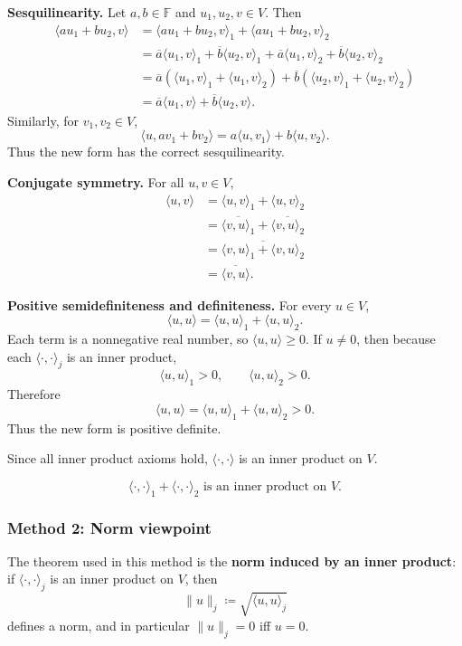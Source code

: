 \documentclass[12pt]{article}
\newcommand{\df}{\coloneqq}
\newcommand{\F}{\mathbb{F}}
\begin{document}
\medskip
\noindent\textbf{Sesquilinearity.}
Let $a,b\in\F$ and $u_1,u_2,v\in V$. Then
\begin{align*}
\langle au_1+bu_2,v\rangle
&=\langle au_1+bu_2,v\rangle_1+\langle au_1+bu_2,v\rangle_2\\
&=\overline{a}\langle u_1,v\rangle_1+
\overline{b}\langle u_2,v\rangle_1+
\overline{a}\langle u_1,v\rangle_2+
\overline{b}\langle u_2,v\rangle_2\\
&=\overline{a}(\langle u_1,v\rangle_1+\langle u_1,v\rangle_2)
+\overline{b}(\langle u_2,v\rangle_1+\langle u_2,v\rangle_2)\\
&=\overline{a}\langle u_1,v\rangle+\overline{b}\langle u_2,v\rangle.
\end{align*}
Similarly, for $v_1,v_2\in V$,
\[
\langle u,av_1+bv_2\rangle=a\langle u,v_1\rangle+b\langle u,v_2\rangle.
\]
Thus the new form has the correct sesquilinearity.

\medskip
\noindent\textbf{Conjugate symmetry.}
For all $u,v\in V$,
\begin{align*}
\langle u,v\rangle
&=\langle u,v\rangle_1+\langle u,v\rangle_2\\
&=\overline{\langle v,u\rangle_1}+\overline{\langle v,u\rangle_2}\\
&=\overline{\langle v,u\rangle_1+\langle v,u\rangle_2}\\
&=\overline{\langle v,u\rangle}.
\end{align*}

\medskip
\noindent\textbf{Positive semidefiniteness and definiteness.}
For every $u\in V$,
\[
\langle u,u\rangle=\langle u,u\rangle_1+\langle u,u\rangle_2.
\]
Each term is a nonnegative real number, so $\langle u,u\rangle\ge 0$. If $u\neq 0$, then because each $\langle\cdot,\cdot\rangle_j$ is an inner product,
\[
\langle u,u\rangle_1>0,
\qquad
\langle u,u\rangle_2>0.
\]
Therefore
\[
\langle u,u\rangle=\langle u,u\rangle_1+\langle u,u\rangle_2>0.
\]
Thus the new form is positive definite.

Since all inner product axioms hold, $\langle\cdot,\cdot\rangle$ is an inner product on $V$.

\[
\boxed{\,\langle\cdot,\cdot\rangle_1+\langle\cdot,\cdot\rangle_2\text{ is an inner product on }V.\,}
\]

\newpage
\subsubsection{Method 2: Norm viewpoint}
The theorem used in this method is the \textbf{norm induced by an inner product}: if $\langle\cdot,\cdot\rangle_j$ is an inner product on $V$, then
\[
\|u\|_j\df \sqrt{\langle u,u\rangle_j}
\]
defines a norm, and in particular $\|u\|_j=0$ iff $u=0$.
\end{document}
